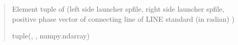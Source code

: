 \documentclass[letterpaper,10pt,english]{sphinxmanual}
\begin{document}
\begin{fulllineitems}
\begin{quote}
\begin{description}
\sphinxhyphen{}Element tuple of (left side launcher spfile, right side launcher spfile, positive phase vector of connecting line of LINE standard (in radian) )

\sphinxAtStartPar
tuple({\hyperref[\detokenize{touchstone:touchstone.spfile}]{}}, {\hyperref[\detokenize{touchstone:touchstone.spfile}]{}}, numpy.ndarray)

\end{description}\end{quote}

\end{fulllineitems}

\end{document}
